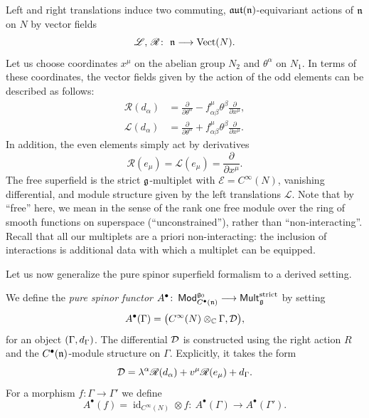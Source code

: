 \documentclass[11pt]{article}
\numberwithin{equation}{section}
\numberwithin{equation}{section}
\def\cE{\mathcal E}\def\cF{\mathcal F}\def\cG{\mathcal G}\def\cH{\mathcal H}
\def\cat#1{\ensuremath{\mathsf{#1}}}
\DeclareMathOperator{\Mod}{\cat{Mod}}
\DeclareMathOperator{\Mult}{\cat{Mult}}
\def\lie#1{\ensuremath{\mathfrak{#1}}}
\def\aut{\ensuremath{\lie{aut}}}
\def\d{{\rm d}}
\DeclareMathOperator{\id}{id}
\DeclareMathOperator{\Vect}{Vect}
\def\sL{\mathscr L}
\def\sR{\mathscr R}
\begin{document}
Left and right translations induce two commuting, $\aut(\fn)$-equivariant actions of $\mathfrak n$ on $N$ by vector fields
\begin{equation*}
\sL,\, \sR \colon \ \fn \longrightarrow \Vect(N) .
\end{equation*}
Let us choose coordinates $x^\mu$ on the abelian group $N_2$
and $\theta^\alpha$ on $N_1$. In terms of these coordinates, the vector fields given by the action of the odd elements can be described as follows:
\begin{equation*}
\begin{split}
\sR(d_\alpha) &= \frac{\partial}{\partial \theta^\alpha} - f^\mu_{\alpha \beta} \theta^\beta \frac{\partial}{\partial x^\mu}, \\
\sL(d_\alpha) &= \frac{\partial}{\partial \theta^\alpha} + f^\mu_{\alpha \beta} \theta^\beta \frac{\partial}{\partial x^\mu}.
\end{split}
\end{equation*}
In addition, the even elements simply act by derivatives
\begin{equation*}
\sR(e_\mu) = \sL(e_\mu) = \frac{\partial}{\partial x^\mu}.
\end{equation*}
The free superfield is the strict $\mathfrak g$-multiplet with $\cE = C^\infty(N)$, vanishing differential, and module structure given by the left translations $\sL$. Note that by ``free'' here, we mean in the sense of the rank one free module over the ring of smooth functions on superspace (``unconstrained''), rather than ``non-interacting''. Recall that all our multiplets are a priori non-interacting: the inclusion of interactions is additional data with which a multiplet can be equipped.


Let us now generalize the pure spinor superfield formalism to a derived setting.
\begin{dfn}
	We define the \emph{pure spinor functor} $A^\bullet \colon \Mod_{C^\bullet(\fn)}^{\fg_0} \longrightarrow \Mult_{\fg}^{\mathrm{strict}}$ by setting
	\begin{equation*}
	A^\bullet(\Gamma) = \big(C^\infty(N) \otimes_\mathbb C \Gamma , \mathcal D\big) ,
	\end{equation*}
	for an object $(\Gamma , \d_\Gamma)$.
	The differential $\mathcal D$ is constructed using the right action $R$ and the $C^\bullet(\mathfrak n)$-module structure on $\Gamma$. Explicitly, it takes the form
	\begin{equation*}
	\cD = \lambda^\alpha \sR(d_\alpha) + v^\mu \sR(e_\mu) + \d_\Gamma .
	\end{equation*}
	For a morphism $f\colon\Gamma \longrightarrow \Gamma'$ we define
	\begin{equation*}
	A^\bullet(f) = \id_{C^\infty(N)} \otimes f \colon \ A^\bullet(\Gamma) \longrightarrow A^\bullet(\Gamma') .
	\end{equation*}
\end{dfn}
\end{document}

